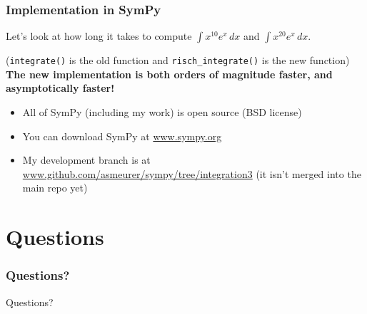 \documentclass{beamer}
\numberwithin{equation}{section} %
\newcommand{\rischintegrate}{\texttt{risch\_integrate()}}
\begin{document}
\begin{frame}
    \frametitle{Implementation in SymPy}
    Let's look at how long it takes to compute $\int{x^{10}e^x\,dx}$ and $\int{x^{20}e^x\,dx}$.
    \begin{figure}
    \begin{flushleft}
    \end{flushleft}
    \end{figure}
    (\texttt{integrate()} is the old function and \rischintegrate{} is
    the new function)\\
    \pause
    {\bf The new implementation is both orders of magnitude faster, and
    asymptotically faster!}
\end{frame}

\begin{frame}
    \begin{itemize}
        \item All of SymPy (including my work) is open source (BSD license)
        \item You can download SymPy at \url{www.sympy.org}
        \item My development branch is at
        \url{www.github.com/asmeurer/sympy/tree/integration3} (it
        isn't merged into the main repo yet)
    \end{itemize}
\end{frame}

\section{Questions}

\begin{frame}
    \frametitle{Questions?}
    \huge{Questions?}
\end{frame}
\end{document}

